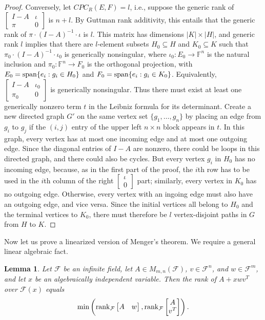 \documentclass{amsart}
\newtheorem{lem}[thm]{Lemma}
\theoremstyle{definition}
\begin{document}
\begin{proof}
Conversely, let $CPC_R(E, F) = l$, i.e., suppose the generic rank of $\left[\begin{matrix}I - A& \iota\\ \pi&0\end{matrix}\right]$ is $n + l$. By Guttman rank additivity, this entails that the generic rank of $\pi\cdot (I - A)^{-1}\cdot \iota$ is $l$. This matrix has dimensions $|K| \times |H|$, and generic rank $l$ implies that there are $l$-element subsets $H_0 \subseteq H$ and $K_0 \subseteq K$ such that $\pi_0\cdot (I-A)^{-1}\cdot \iota_0$ is generically nonsingular, where $\iota_0: E_0 \to \mathbb{F}^n$ is the natural inclusion and $\pi_0: \mathbb{F}^n \to F_0$ is the orthogonal projection, with $E_0 = {\rm span}\{e_i: g_i \in H_0\}$ and $F_0 = {\rm span}\{e_i: g_i \in K_0\}$. Equivalently, $\left[\begin{matrix}I - A& \iota_0\\ \pi_0&0\end{matrix}\right]$ is generically nonsingular. Thus there must exist at least one generically nonzero term $t$ in the Leibniz formula for its determinant. Create a new directed graph $G'$ on the same vertex set $\{g_1, \ldots, g_n\}$ by placing an edge from $g_i$ to $g_j$ if the $(i,j)$ entry of the upper left $n\times n$ block appears in $t$. In this graph, every vertex has at most one incoming edge and at most one outgoing edge. Since the diagonal entries of $I - A$ are nonzero, there could be loops in this directed graph, and there could also be cycles. But every vertex $g_i$ in $H_0$ has no incoming edge, because, as in the first part of the proof, the $i$th row has to be used in the $i$th column of the right $\left[\begin{matrix}\iota \\ 0\end{matrix}\right]$ part; similarly, every vertex in $K_0$ has no outgoing edge. Otherwise, every vertex with an ingoing edge must also have an outgoing edge, and vice versa. Since the initial vertices all belong to $H_0$ and the terminal vertices to $K_0$, there must therefore be $l$ vertex-disjoint paths in $G$ from $H$ to $K$.
\end{proof}

Now let us prove a linearized version of Menger's theorem. We require a general linear algebraic fact.

\begin{lem}\label{ranklem}
Let $\mathcal{F}$ be an infinite field, let $A \in M_{m,n}(\mathcal{F})$, $v \in \mathcal{F}^n$, and $w \in \mathcal{F}^m$, and let $x$ be an algebraically independent variable. Then the rank of $A + xwv^T$ over $\mathcal{F}(x)$ equals $$\min\left({\rm rank}_{\mathcal{F}}\left[\begin{matrix} A&w\end{matrix}\right], {\rm rank}_{\mathcal{F}}\left[\begin{matrix} A\\ v^T\end{matrix}\right]\right).$$
\end{lem}
\end{document}
